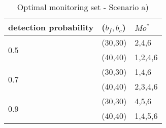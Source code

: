 \begin{table}[h]
\large
\centering
\begin{tabular}{|l|l|l|}
\hline
detection probability & ($b_f,b_c$) & $Mo^*$  \\ \hline \hline
\multirow{2}{*}{0.5}  & (30,30)     & 2,4,6   \\ \cline{2-3} 
                      & (40,40)     & 1,2,4,6 \\ \hline \hline
\multirow{2}{*}{0.7}  & (30,30)     & 1,4,6   \\ \cline{2-3} 
                      & (40,40)     & 2,3,4,6 \\ \hline \hline
\multirow{2}{*}{0.9}  & (30,30)     & 4,5,6   \\ \cline{2-3} 
                      & (40,40)     & 1,4,5,6 \\ \hline
\end{tabular}
\caption{Optimal monitoring set - Scenario a)}
\label{tab:optiset}
\end{table}